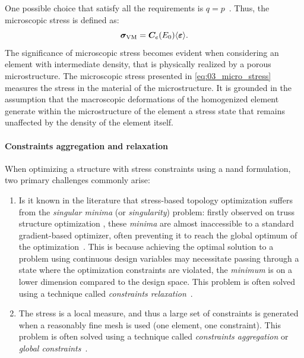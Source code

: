 One possible choice that satisfy all the requirements is $q=p$~. Thus, the microscopic stress is defined as:
\begin{equation}
    \bm{\sigma}_{\text{VM}} = \bm{C}_e(E_0)\langle \bm{\varepsilon} \rangle.
    \label{eq:03_micro_stress}
\end{equation}
The significance of microscopic stress becomes evident when considering an element with intermediate density, that is physically realized by a porous microstructure. The microscopic stress presented in \eqref{eq:03_micro_stress} measures the stress in the material of the microstructure. It is grounded in the assumption that the macroscopic deformations of the homogenized element generate within the microstructure of the element a stress state that remains unaffected by the density of the element itself.

\paragraph{Constraints aggregation and relaxation}
When optimizing a structure with stress constraints using a \gls{nand} formulation, two primary challenges commonly arise:
\begin{enumerate}[label=(\roman*)]
    \item Is it known in the literature  that stress-based topology optimization suffers from the \textit{singular minima} (or \textit{singularity}) problem: firstly observed on truss structure optimization , these \textit{minima} are almost inaccessible to a standard gradient-based optimizer, often preventing it to reach the global optimum of the optimization~\cite{rozvany_design-dependent_2001}. This is because achieving the optimal solution to a problem using continuous design variables may necessitate passing through a state where the optimization constraints are violated, \ie the \textit{minimum} is on a lower dimension compared to the design space. This problem is often solved using a technique called \textit{constraints relaxation}~.

    \item The stress is a local measure, and thus a large set of constraints is generated when a reasonably fine mesh is used (one element, one constraint). This problem is often solved using a technique called \textit{constraints aggregation} or \textit{global constraints}~.
\end{enumerate} 

